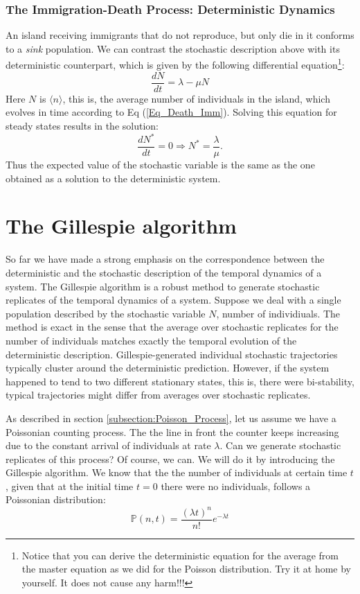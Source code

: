 \documentclass{article}
\newcommand{\Pb}{{\mathbb P}}
\begin{document}
\subsubsection{The Immigration-Death Process: Deterministic Dynamics}
An island receiving immigrants that do not reproduce, but only die in it conforms to a \textit{sink} population. We can contrast the stochastic description above with its deterministic counterpart, which is given by the following differential equation\footnote{Notice that you can derive the deterministic equation for the average from the master equation as we did for the Poisson distribution. Try it at home by yourself. It does not cause any harm!!!}: 
\begin{equation}
\frac{dN}{dt} = \lambda - \mu N
\label{Eq_Death_Imm}
\end{equation}
Here $N$ is $\langle n \rangle$, this is, the average number of individuals in the island, which evolves in time according to Eq (\ref{Eq_Death_Imm}).  Solving this equation for steady states results in the solution: 
$$\frac{dN^*}{dt} = 0 \Rightarrow N^* = \frac{\lambda}{\mu}. $$
Thus the expected value of the stochastic variable is the same as the one obtained as a solution to the deterministic system. 

\section{The Gillespie algorithm}
So far we have made a strong emphasis on the correspondence between the deterministic and the stochastic description of the temporal dynamics of a system. The Gillespie algorithm is a robust method to generate stochastic replicates of the temporal dynamics of a system. Suppose we deal with a single population described by the stochastic variable $N$, number of individiuals. The method is exact in the sense that the average over stochastic replicates for the number of individuals matches exactly the temporal evolution of the deterministic description. Gillespie-generated individual stochastic trajectories typically cluster around the deterministic prediction. However, if the system happened to tend to two different stationary states, this is, there were bi-stability, typical trajectories might differ from averages over stochastic replicates.  
\smallskip

As described in section \ref{subsection:Poisson_Process}, let us assume we have a Poissonian counting process. The the line in front the counter keeps increasing due to the constant arrival of individuals at rate $\lambda$. Can we generate stochastic replicates of this process? Of course, we can. We will do it by introducing the Gillespie algorithm. We know that the the number of individuals at certain time $t$, given that at the initial time $t=0$ there were no individuals, follows a Poissonian distribution:
\begin{equation}
\Pb(n, t) =  \frac{(\lambda t)^n}{n!} e^{-\lambda t}
\label{Poisson_Distribution}
\end{equation}
\end{document}
